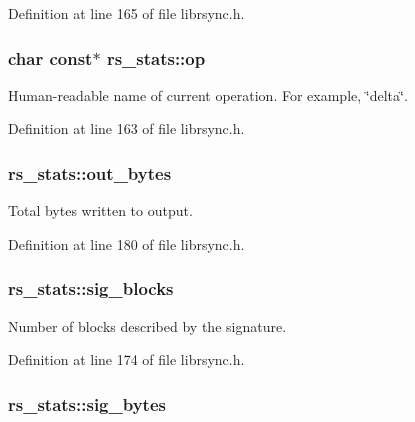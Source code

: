 Definition at line 165 of file librsync.\+h.

\hypertarget{structrs__stats_a7bea565f5d1687eb6b953b518034d43c}{}
\subsubsection[{op}]{\setlength{\rightskip}{0pt plus 5cm}char const$\ast$ rs\+\_\+stats\+::op}\label{structrs__stats_a7bea565f5d1687eb6b953b518034d43c}
Human-\/readable name of current operation. For example, \char`\"{}delta\char`\"{}. 

Definition at line 163 of file librsync.\+h.

\hypertarget{structrs__stats_ace1905d4a0a8d1dfd76a94051afbe571}{}
\subsubsection[{out\+\_\+bytes}]{ rs\+\_\+stats\+::out\+\_\+bytes}\label{structrs__stats_ace1905d4a0a8d1dfd76a94051afbe571}
Total bytes written to output. 

Definition at line 180 of file librsync.\+h.

\hypertarget{structrs__stats_acacc5f67f9babdefed46bf12473c985f}{}
\subsubsection[{sig\+\_\+blocks}]{ rs\+\_\+stats\+::sig\+\_\+blocks}\label{structrs__stats_acacc5f67f9babdefed46bf12473c985f}
Number of blocks described by the signature. 

Definition at line 174 of file librsync.\+h.

\hypertarget{structrs__stats_acc808480deca2206d1e619ae1915a3a2}{}
\subsubsection[{sig\+\_\+bytes}]{ rs\+\_\+stats\+::sig\+\_\+bytes}\label{structrs__stats_acc808480deca2206d1e619ae1915a3a2}


